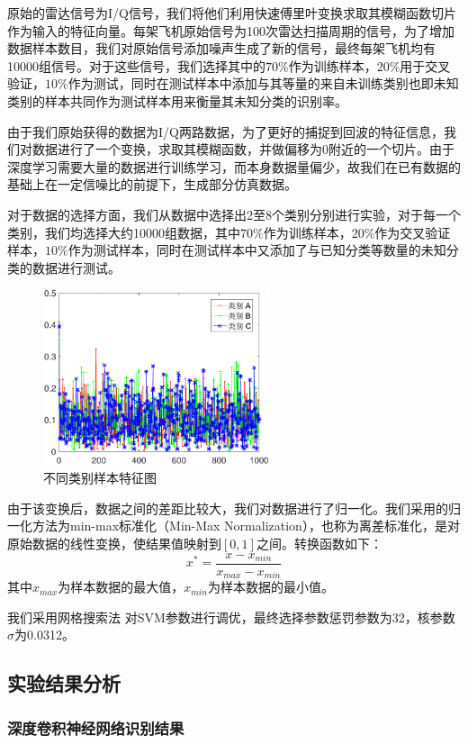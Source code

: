 原始的雷达信号为I/Q信号，我们将他们利用快速傅里叶变换求取其模糊函数切片作为输入的特征向量。每架飞机原始信号为100次雷达扫描周期的信号，为了增加数据样本数目，我们对原始信号添加噪声生成了新的信号，最终每架飞机均有10000组信号。对于这些信号，我们选择其中的$70\%$作为训练样本，$20\%$用于交叉验证，$10\%$作为测试，同时在测试样本中添加与其等量的来自未训练类别也即未知类别的样本共同作为测试样本用来衡量其未知分类的识别率。

由于我们原始获得的数据为I/Q两路数据，为了更好的捕捉到回波的特征信息，我们对数据进行了一个变换，求取其模糊函数，并做偏移为0附近的一个切片。由于深度学习需要大量的数据进行训练学习，而本身数据量偏少，故我们在已有数据的基础上在一定信噪比的前提下，生成部分仿真数据。

对于数据的选择方面，我们从数据中选择出2至8个类别分别进行实验，对于每一个类别，我们均选择大约10000组数据，其中$70\%$作为训练样本，$20\%$作为交叉验证样本，$10\%$作为测试样本，同时在测试样本中又添加了与已知分类等数量的未知分类的数据进行测试。
\begin{figure}[hbt]
	\centering
	\includegraphics[width=6.67cm]{figures/emitter/diff_data}
	\caption{不同类别样本特征图}
\end{figure}
由于该变换后，数据之间的差距比较大，我们对数据进行了归一化。我们采用的归一化方法为min-max标准化（Min-Max Normalization），也称为离差标准化，是对原始数据的线性变换，使结果值映射到$[0 , 1]$之间。转换函数如下：
\begin{equation}
x^{*}=\frac{x-x_{min}}{x_{max}-x_{min}}
\end{equation}
其中$x_{max}$为样本数据的最大值，$x_{min}$为样本数据的最小值。

我们采用网格搜索法
对SVM参数进行调优，最终选择参数惩罚参数为32，核参数$\sigma$为0.0312。

\subsection{实验结果分析}

\subsubsection{深度卷积神经网络识别结果}

